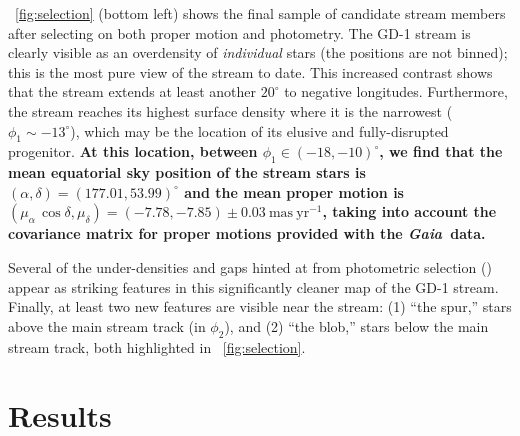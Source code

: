 \documentclass[modern]{aastex62}
\newcommand{\gaia}{\textsl{Gaia}}
\newcommand{\masyr}{\ensuremath{\textrm{mas}~\textrm{yr}^{-1}}}
\newcommand{\sectionname}{Section}
\newcommand{\changes}[1]{{\textbf{#1}}}
\begin{document}
\figurename~\ref{fig:selection} (bottom left) shows the final sample of
candidate stream members after selecting on both proper motion and photometry.
The GD-1 stream is clearly visible as an overdensity of \emph{individual}
stars (the positions are not binned); this is the most pure view of the stream
to date.
This increased contrast shows that the stream extends at least another
$20^\circ$ to negative longitudes.
Furthermore, the stream reaches its highest surface density where it is the
narrowest ($\phi_1\sim-13^\circ$), which may be the location of its elusive and
fully-disrupted progenitor.
\changes{At this location, between $\phi_1 \in (-18, -10)^\circ$, we find that the mean equatorial sky position of the stream stars is $(\alpha, \delta) = (177.01, 53.99)^\circ$ and the mean proper motion is $(\mu_\alpha \, \cos\delta, \mu_\delta) = (-7.78, -7.85) \pm 0.03~\masyr$, taking into account the covariance matrix for proper motions provided with the \gaia\ data.}

Several of the under-densities and gaps hinted at from photometric selection
(\citealt{Carlberg:2013, DeBoer:2018}) appear as striking features in this
significantly cleaner map of the GD-1 stream.
Finally, at least two new features are visible near the stream: (1) ``the
spur,'' stars above the main stream track (in $\phi_2$), and (2) ``the blob,''
stars below the main stream track, both highlighted in
\figurename~\ref{fig:selection}.


\section{Results}
\label{sec:results}

\end{document}
